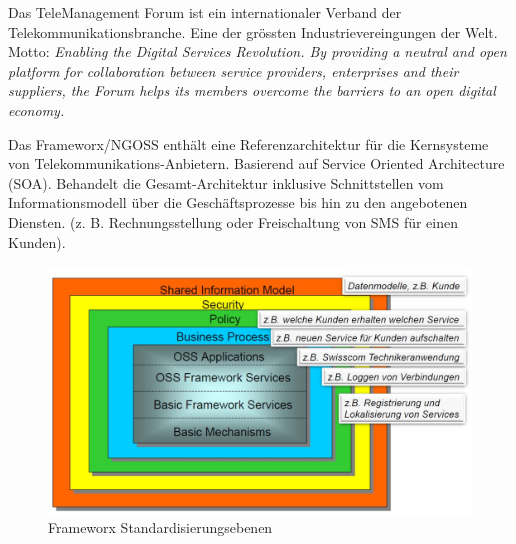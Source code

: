 Das TeleManagement Forum ist ein internationaler Verband der Telekommunikationsbranche. Eine der grössten Industrievereingungen der Welt. Motto: \textit{Enabling the Digital Services Revolution. By providing a neutral and open platform for collaboration between service providers, enterprises and their suppliers, the Forum helps its members overcome the barriers to an open digital economy.}

Das Frameworx/NGOSS enthält eine Referenzarchitektur für die Kernsysteme von Telekommunikations-Anbietern. Basierend auf Service Oriented Architecture (SOA). Behandelt die Gesamt-Architektur inklusive Schnittstellen vom Informationsmodell über die Geschäftsprozesse bis hin zu den angebotenen Diensten. (z. B. Rechnungsstellung oder Freischaltung von SMS für einen Kunden).

\begin{figure}[h!]
\centering
\includegraphics[width=0.7\linewidth]{fig/frameworx-standardisierungsebenen}
\caption{Frameworx Standardisierungsebenen}
\label{fig:frameworx-standardisierungsebenen}
\end{figure}
